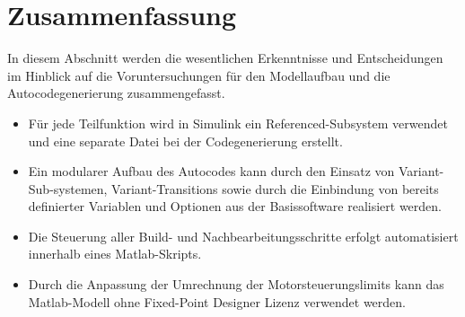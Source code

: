 \section{Zusammenfassung}
In diesem Abschnitt werden die wesentlichen Erkenntnisse und Entscheidungen im Hinblick auf die Voruntersuchungen für den Modellaufbau und die Autocodegenerierung zusammengefasst.
\begin{itemize}
\item Für jede Teilfunktion wird in Simulink ein Referenced-Subsystem verwendet und eine separate Datei bei der Codegenerierung erstellt. 
\item Ein modularer Aufbau des Autocodes kann durch den Einsatz von Variant-Sub-systemen, Variant-Transitions sowie durch die Einbindung von bereits definierter Variablen und Optionen aus der Basissoftware realisiert werden.
\item Die Steuerung aller Build- und Nachbearbeitungsschritte erfolgt automatisiert innerhalb eines Matlab-Skripts. 
\item Durch die Anpassung der Umrechnung der Motorsteuerungslimits kann das Matlab-Modell ohne Fixed-Point Designer Lizenz verwendet werden.
\end{itemize}


